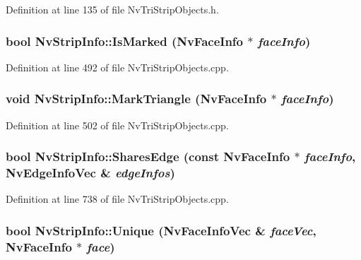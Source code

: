 Definition at line 135 of file NvTriStripObjects.h.\hypertarget{class_nv_strip_info_39fda0ba3c1858cf70f9925e7f6db775}{
\subsubsection[{IsMarked}]{\setlength{\rightskip}{0pt plus 5cm}bool NvStripInfo::IsMarked ({\bf NvFaceInfo} $\ast$ {\em faceInfo})}}
\label{class_nv_strip_info_39fda0ba3c1858cf70f9925e7f6db775}




Definition at line 492 of file NvTriStripObjects.cpp.\hypertarget{class_nv_strip_info_39fa1a91968f900b5fa1280f018ac15b}{
\subsubsection[{MarkTriangle}]{\setlength{\rightskip}{0pt plus 5cm}void NvStripInfo::MarkTriangle ({\bf NvFaceInfo} $\ast$ {\em faceInfo})}}
\label{class_nv_strip_info_39fa1a91968f900b5fa1280f018ac15b}




Definition at line 502 of file NvTriStripObjects.cpp.\hypertarget{class_nv_strip_info_2ad96d160c282ac7921c33c0ce1c12b0}{
\subsubsection[{SharesEdge}]{\setlength{\rightskip}{0pt plus 5cm}bool NvStripInfo::SharesEdge (const {\bf NvFaceInfo} $\ast$ {\em faceInfo}, \/  {\bf NvEdgeInfoVec} \& {\em edgeInfos})}}
\label{class_nv_strip_info_2ad96d160c282ac7921c33c0ce1c12b0}




Definition at line 738 of file NvTriStripObjects.cpp.\hypertarget{class_nv_strip_info_3c611dfae22e219ed0eedcb95fd33d1c}{
\subsubsection[{Unique}]{\setlength{\rightskip}{0pt plus 5cm}bool NvStripInfo::Unique ({\bf NvFaceInfoVec} \& {\em faceVec}, \/  {\bf NvFaceInfo} $\ast$ {\em face})}}
\label{class_nv_strip_info_3c611dfae22e219ed0eedcb95fd33d1c}




